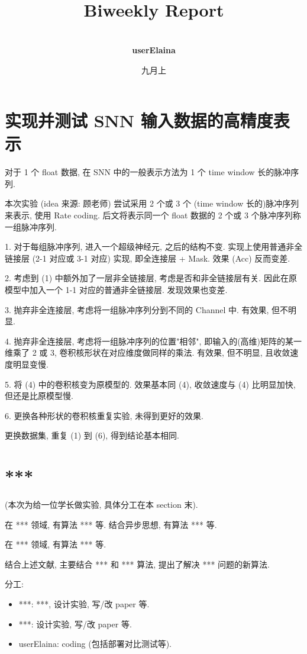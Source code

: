 \documentclass[a4paper]{article}
\title{
    \vspace*{1.0in}
     \\
    \vspace*{1in}
    \textbf{\Huge Biweekly Report}
    \vspace{0.5in}
}
\author{ \\
    \textbf{\huge userElaina} \\
    \vspace*{1in}
}
\date{\LARGE 九月上}
\begin{document}
\LARGE

\maketitle
\tableofcontents
\thispagestyle{empty}
\newpage

\section{实现并测试 SNN 输入数据的高精度表示}

对于 1 个 float 数据, 在 SNN 中的一般表示方法为 1 个 time window 长的脉冲序列. 

本次实验 (idea 来源: 顾老师) 尝试采用 2 个或 3 个 (time window 长的)脉冲序列来表示, 使用 Rate coding. 后文将表示同一个 float 数据的 2 个或 3 个脉冲序列称一组脉冲序列.

1. 对于每组脉冲序列, 进入一个超级神经元, 之后的结构不变. 实现上使用普通非全链接层 (2-1 对应或 3-1 对应) 实现, 即全连接层 + Mask. 效果 (Acc) 反而变差.

2. 考虑到 (1) 中额外加了一层非全链接层, 考虑是否和非全链接层有关. 因此在原模型中加入一个 1-1 对应的普通非全链接层. 发现效果也变差.

3. 抛弃非全连接层, 考虑将一组脉冲序列分到不同的 Channel 中. 有效果, 但不明显.

4. 抛弃非全连接层, 考虑将一组脉冲序列的位置"相邻", 即输入的(高维)矩阵的某一维乘了 2 或 3, 卷积核形状在对应维度做同样的乘法. 有效果, 但不明显, 且收敛速度明显变慢.

5. 将 (4) 中的卷积核变为原模型的. 效果基本同 (4), 收敛速度与 (4) 比明显加快, 但还是比原模型慢.

6. 更换各种形状的卷积核重复实验, 未得到更好的效果.

更换数据集, 重复 (1) 到 (6), 得到结论基本相同.

\section{***}

(本次为给一位学长做实验, 具体分工在本 section 末).

在 *** 领域, 有算法 *** 等. 结合异步思想, 有算法 *** 等.

在 *** 领域, 有算法 *** 等.

结合上述文献, 主要结合 *** 和 *** 算法, 提出了解决 *** 问题的新算法.

分工:

\begin{itemize}
    \item ***: ***, 设计实验, 写/改 paper 等.
    \item ***: 设计实验, 写/改 paper 等.
    \item userElaina: coding (包括部署对比测试等).
\end{itemize}
\end{document}
